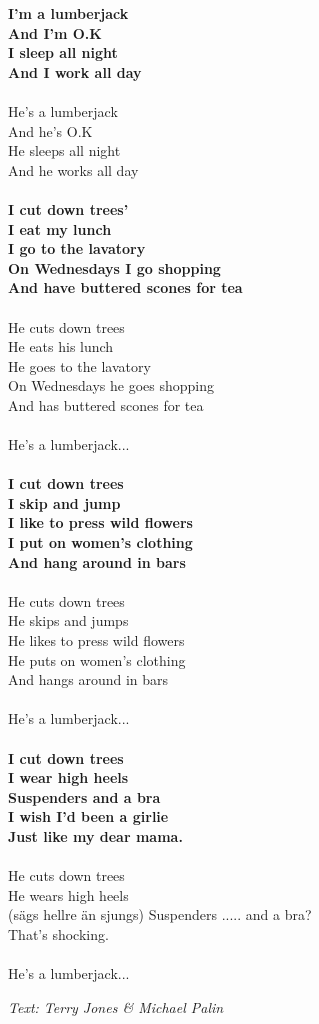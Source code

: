 \visa{}
\vspace{10pt}
\textbf{
I'm a lumberjack\\
And I'm O.K\\
I sleep all night\\
And I work all day\\
}
\\
He's a lumberjack\\
And he's O.K\\
He sleeps all night\\
And he works all day\\
\\
\textbf{
I cut down trees'\\
I eat my lunch\\
I go to the lavatory\\
On Wednesdays I go shopping\\
And have buttered scones for tea\\
}
\\
He cuts down trees\\
He eats his lunch\\
He goes to the lavatory\\
On Wednesdays he goes shopping\\
And has buttered scones for tea\\
\\
He's a lumberjack...\\
\\
\textbf{
I cut down trees\\
I skip and jump\\
I like to press wild flowers\\
I put on women's clothing\\
And hang around in bars\\
}
\\
He cuts down trees\\
He skips and jumps\\
He likes to press wild flowers\\
He puts on women's clothing\\
And hangs around in bars\\
\\
He's a lumberjack...\\
\\
\textbf{
I cut down trees\\
I wear high heels\\
Suspenders and a bra\\
I wish I'd been a girlie\\
Just like my dear mama.\\
}
\\
He cuts down trees\\
He wears high heels\\
(sägs hellre än sjungs) Suspenders ..... and a bra?\\
That's shocking.\\
\\
He's a lumberjack...
\par
\vspace{10pt}
{\footnotesize\textit{Text: Terry Jones \& Michael Palin}}
